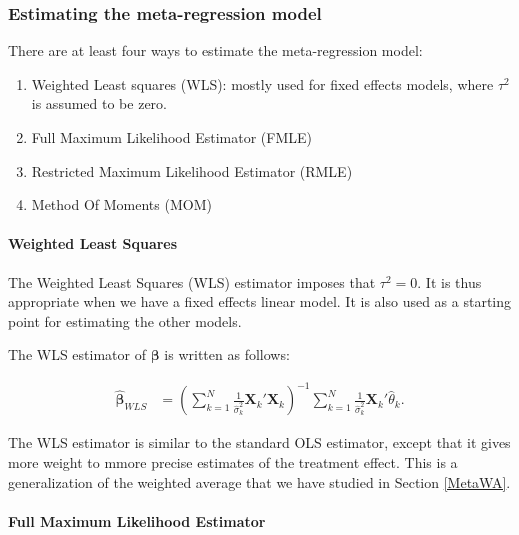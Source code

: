 \documentclass[
]{book}
\providecommand{\tightlist}{%
  \setlength{\itemsep}{0pt}\setlength{\parskip}{0pt}}
\theoremstyle{definition}
\theoremstyle{definition}
\theoremstyle{definition}
\theoremstyle{definition}
\theoremstyle{remark}
\begin{document}
\hypertarget{estimating-the-meta-regression-model}{%
\subsubsection{Estimating the meta-regression model}\label{estimating-the-meta-regression-model}}

There are at least four ways to estimate the meta-regression model:

\begin{enumerate}
\def\labelenumi{\arabic{enumi}.}
\tightlist
\item
  Weighted Least squares (WLS): mostly used for fixed effects models, where \(\tau^2\) is assumed to be zero.
\item
  Full Maximum Likelihood Estimator (FMLE)
\item
  Restricted Maximum Likelihood Estimator (RMLE)
\item
  Method Of Moments (MOM)
\end{enumerate}

\hypertarget{weighted-least-squares}{%
\paragraph{Weighted Least Squares}\label{weighted-least-squares}}

The Weighted Least Squares (WLS) estimator imposes that \(\tau^2=0\).
It is thus appropriate when we have a fixed effects linear model.
It is also used as a starting point for estimating the other models.

The WLS estimator of \(\mathbf{\beta}\) is written as follows:

\begin{align*}
  \mathbf{\hat{\beta}}_{WLS} & = \left(\sum_{k=1}^N\frac{1}{\hat{\sigma}^2_k}\mathbf{X}_k'\mathbf{X}_k\right)^{-1}\sum_{k=1}^N\frac{1}{\hat{\sigma}^2_k}\mathbf{X}_k'\hat{\theta}_k.
\end{align*}

The WLS estimator is similar to the standard OLS estimator, except that it gives more weight to mmore precise estimates of the treatment effect.
This is a generalization of the weighted average that we have studied in Section \ref{MetaWA}.

\hypertarget{full-maximum-likelihood-estimator}{%
\paragraph{Full Maximum Likelihood Estimator}\label{full-maximum-likelihood-estimator}}
\end{document}
